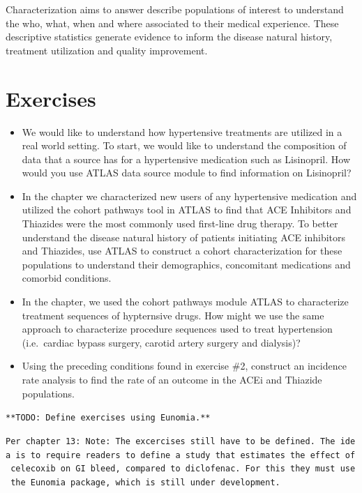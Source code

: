\documentclass[11pt]{book}
\providecommand{\tightlist}{%
  \setlength{\itemsep}{0pt}\setlength{\parskip}{0pt}}
\theoremstyle{definition}
\theoremstyle{definition}
\theoremstyle{definition}
\theoremstyle{remark}
\begin{document}
Characterization aims to answer describe populations of interest to understand the who, what, when and where associated to their medical experience. These descriptive statistics generate evidence to inform the disease natural history, treatment utilization and quality improvement.

\hypertarget{exercises-4}{%
\section{Exercises}\label{exercises-4}}

\begin{itemize}
\tightlist
\item
  We would like to understand how hypertensive treatments are utilized in a real world setting. To start, we would like to understand the composition of data that a source has for a hypertensive medication such as Lisinopril. How would you use ATLAS data source module to find information on Lisinopril?
\item
  In the chapter we characterized new users of any hypertensive medication and utilized the cohort pathways tool in ATLAS to find that ACE Inhibitors and Thiazides were the most commonly used first-line drug therapy. To better understand the disease natural history of patients initiating ACE inhibitors and Thiazides, use ATLAS to construct a cohort characterization for these populations to understand their demographics, concomitant medications and comorbid conditions.
\item
  In the chapter, we used the cohort pathways module ATLAS to characterize treatment sequences of hypternsive drugs. How might we use the same approach to characterize procedure sequences used to treat hypertension (i.e.~cardiac bypass surgery, carotid artery surgery and dialysis)?
\item
  Using the preceding conditions found in exercise \#2, construct an incidence rate analysis to find the rate of an outcome in the ACEi and Thiazide populations.
\end{itemize}

\texttt{**TODO:\ Define\ exercises\ using\ Eunomia.**}

\texttt{Per\ chapter\ 13:\ Note:\ The\ excercises\ still\ have\ to\ be\ defined.\ The\ idea\ is\ to\ require\ readers\ to\ define\ a\ study\ that\ estimates\ the\ effect\ of\ celecoxib\ on\ GI\ bleed,\ compared\ to\ diclofenac.\ For\ this\ they\ must\ use\ the\ Eunomia\ package,\ which\ is\ still\ under\ development.}
\end{document}
